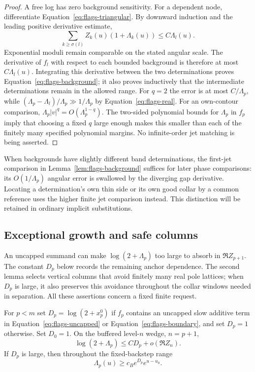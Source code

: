 \begin{proof}
A free log has zero background sensitivity. For a dependent node,
differentiate Equation~\eqref{eq:flags-triangular}. By downward
induction and the leading positive derivative estimate,
\[
 \sum_{k\ge\sigma(l)}Z_k(u)(1+\Lambda_k(u))
       \le C\Lambda_l(u).
\]
Exponential moduli remain comparable on the stated angular scale.
The derivative of $f_l$ with respect to each bounded background is
therefore at most $C\Lambda_l(u)$. Integrating this derivative
between the two determinations proves
Equation~\eqref{eq:flags-background}; it also proves inductively
that the intermediate determinations remain in the allowed range.
For $q=2$ the error is at most $C/\Lambda_p$, while
$(\Lambda_p-\Lambda_l)/\Lambda_p\gg1/\Lambda_p$ by
Equation~\eqref{eq:flags-real}. For an own-contour comparison,
$\Lambda_p|v|^q=O(\Lambda_p^{1-q})$. The two-sided polynomial
bounds for $\Lambda_p$ in $f_p$ imply that choosing a fixed $q$
large enough makes this smaller than each of the finitely many
specified polynomial margins. No infinite-order jet matching is
being asserted.
\end{proof}

When backgrounds have slightly different band determinations, the
first-jet comparison in Lemma~\ref{lem:flags-background} suffices
for later phase comparisons: its $O(1/\Lambda_p)$ angular error
is swallowed by the diverging gap derivative. Locating a
determination's own thin side or its own good collar by a common
reference uses the higher finite jet comparison instead. This
distinction will be retained in ordinary implicit substitutions.

\subsection{Exceptional growth and safe columns}

An uncapped summand can make $\log(2+\Lambda_p)$ too large to
absorb in $\Re Z_{p+1}$. The constant $D_p$ below records the
remaining anchor dependence. The second lemma selects vertical columns
that avoid finitely many real pole lattices; when $D_p$ is large, it
also preserves this avoidance throughout the collar windows needed in
separation. All these assertions concern a fixed finite request.

\begin{lemma}\label{lem:flags-exceptional}
For $p<m$ set $D_p=\log(2+x_p^0)$ if $f_p$ contains an
uncapped slow additive term in
Equation~\eqref{eq:flags-uncapped} or
Equation~\eqref{eq:flags-boundary}, and set $D_p=1$ otherwise.
Set $D_0=1$. On the buffered level-$n$ wedge, $n=p+1$,
\begin{equation}\label{eq:flags-D}
 \log(2+\Lambda_p)\le C D_p+o(\Re Z_n).
\end{equation}
If $D_p$ is large, then throughout the fixed-backstep range
\begin{equation}\label{eq:flags-D-speed}
 \Lambda_p(u)\ge c_B e^{D_p}e^{u-u_0}.
\end{equation}
\end{lemma}

